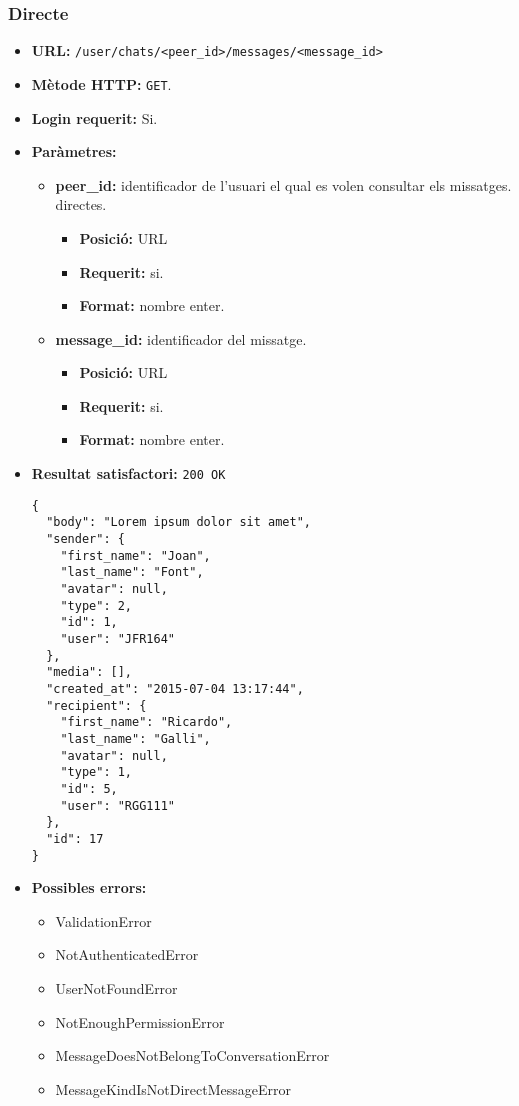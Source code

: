 	\subsubsection{Directe}
	\begin{itemize}
	\item \textbf{\ac{URL}:} \texttt{/user/chats/<peer\_id>/messages/<message\_id>}
	\item \textbf{Mètode \ac{HTTP}: } \texttt{GET}.
	\item \textbf{Login requerit:} Si.
	\item \textbf{Paràmetres:}
	\begin{itemize}
		\item \textbf{peer\_id:} identificador de l'usuari el qual es volen consultar els missatges. directes.
		\begin{itemize}
			\item \textbf{Posició:} \ac{URL}
			\item \textbf{Requerit:} si.
			\item \textbf{Format:} nombre enter.
		\end{itemize}
		\item \textbf{message\_id:} identificador del missatge.
		\begin{itemize}
			\item \textbf{Posició:} \ac{URL}
			\item \textbf{Requerit:} si.
			\item \textbf{Format:} nombre enter.
		\end{itemize}
	\end{itemize}
	\item \textbf{Resultat satisfactori:} \texttt{200 OK}
	\begin{verbatim}
{
  "body": "Lorem ipsum dolor sit amet",
  "sender": {
    "first_name": "Joan",
    "last_name": "Font",
    "avatar": null,
    "type": 2,
    "id": 1,
    "user": "JFR164"
  },
  "media": [],
  "created_at": "2015-07-04 13:17:44",
  "recipient": {
    "first_name": "Ricardo",
    "last_name": "Galli",
    "avatar": null,
    "type": 1,
    "id": 5,
    "user": "RGG111"
  },
  "id": 17
}
	\end{verbatim}
	\item \textbf{Possibles errors:}
	\begin{itemize}
		\item ValidationError
		\item NotAuthenticatedError
		\item UserNotFoundError
		\item NotEnoughPermissionError
		\item MessageDoesNotBelongToConversationError
		\item MessageKindIsNotDirectMessageError
	\end{itemize}
	
	\end{itemize}
	
